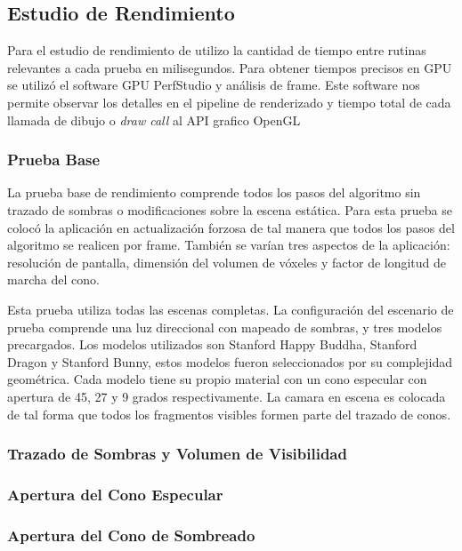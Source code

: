\subsection{Estudio de Rendimiento}

Para el estudio de rendimiento de utilizo la cantidad de tiempo entre rutinas relevantes a cada prueba en milisegundos. Para obtener tiempos precisos en GPU se utilizó el software GPU PerfStudio y análisis de frame. Este software nos permite observar los detalles en el pipeline de renderizado y tiempo total de cada llamada de dibujo o \emph{draw call} al API grafico OpenGL

\subsubsection{Prueba Base}
La prueba base de rendimiento comprende todos los pasos del algoritmo sin trazado de sombras o modificaciones sobre la escena estática. Para esta prueba se colocó la aplicación en actualización forzosa de tal manera que todos los pasos del algoritmo se realicen por frame. También se varían tres aspectos de la aplicación: resolución de pantalla, dimensión del volumen de vóxeles y factor de longitud de marcha del cono.

Esta prueba utiliza todas las escenas completas. La configuración del escenario de prueba comprende una luz direccional con mapeado de sombras, y tres modelos precargados. Los modelos utilizados son Stanford Happy Buddha, Stanford Dragon y Stanford Bunny, estos modelos fueron seleccionados por su complejidad geométrica. Cada modelo tiene su propio material con un cono especular con apertura de 45, 27 y 9 grados respectivamente. La camara en escena es colocada de tal forma que todos los fragmentos visibles formen parte del trazado de conos.


\subsubsection{Trazado de Sombras y Volumen de Visibilidad}

\subsubsection{Apertura del Cono Especular}

\subsubsection{Apertura del Cono de Sombreado}
